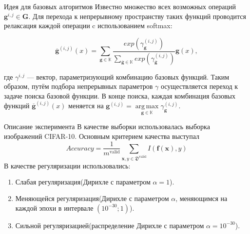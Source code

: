 \documentclass[10pt]{beamer}
\DeclareMathOperator*{\argmax}{arg\,max}
\begin{document}
\begin{frame}{Идея для базовых алгоритмов}
Известно множество всех возможных операций $\mathbf{g}^{i,j} \in \mathbf{G}$. Для перехода к непрерывному пространству таких функций проводится релаксация каждой операции c использованием softmax:


$$\overline{\mathbf{g}}^{(i, j)}(x) = \sum\limits_{\mathbf{g} \in \mathbb{K}}{\frac{exp(\gamma_{\mathbf{g}}^{(i, j)})}{\sum\limits_{\overline{\mathbf{g}} \in \mathbb{K}}exp(\gamma_{\overline{\mathbf{g}}}^{(i, j)})}\mathbf{g}(x)},$$


где $\gamma^{i, j}$ --- вектор, параметризующий комбинацию базовых функций. Таким образом, путём подбора  непрерывных параметров  $\gamma$ осуществляется переход к задаче поиска базовой функции. В конце поиска, каждая комбинация базовых функций $\overline{\mathbf{g}}^{(i, j)}(x) $  меняется на $\mathbf{g}^{(i, j)} = \argmax\limits_{\mathbf{g} \in \mathbb{K}}\gamma_{\mathbf{g}}^{(i, j)}$.\\


\end{frame}

\begin{frame}{Описание эксперимента}
В качестве выборки использовалась выборка изображений CIFAR-10. Основным критерием качества выступал 
$$Accuracy = \frac{1}{m^\text{valid}}\sum_{\mathbf{x}, y \in \mathfrak{D}^\text{valid}} I(\mathbf{f}(\mathbf{x}), y)$$
В качестве регуляризации использовались:\\
\begin{enumerate}
    \item Слабая регуляризация(Дирихле с параметром $\alpha = 1$).\\
    \item Меняющейся регуляризация(Дирихле с параметром $\alpha$, меняющимся на каждой эпохи в интервале $(10^{-30}; 1)$).\\
    \item Сильной регуляризацией(распределение Дирихле с параметром  $\alpha= 10^{-30}$).\\
\end{enumerate}
\end{frame}
\end{document}
